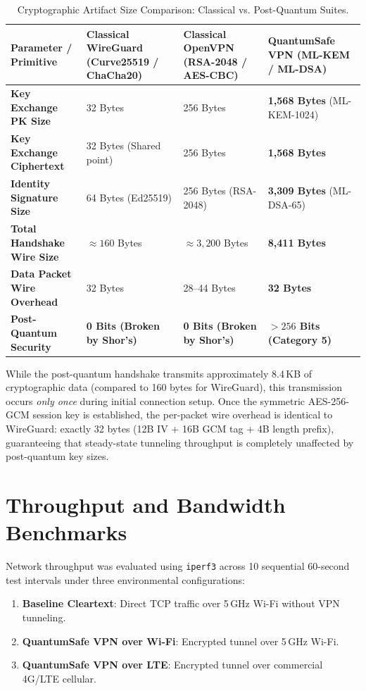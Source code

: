 \begin{table}[htbp]
  \centering
  \small
  \caption{Cryptographic Artifact Size Comparison: Classical vs. Post-Quantum Suites.}
  \label{tab:crypto_size_comparison}
  \begin{tabular}{@{}P{3.6cm}P{3.4cm}P{3.4cm}P{3.6cm}@{}}
    \toprule
    \textbf{Parameter / Primitive} & \textbf{Classical WireGuard (Curve25519 / ChaCha20)} & \textbf{Classical OpenVPN (RSA-2048 / AES-CBC)} & \textbf{QuantumSafe VPN (ML-KEM / ML-DSA)} \\
    \midrule
    \textbf{Key Exchange PK Size} & 32 Bytes & 256 Bytes & \textbf{1,568 Bytes} (ML-KEM-1024) \\
    \textbf{Key Exchange Ciphertext} & 32 Bytes (Shared point) & 256 Bytes & \textbf{1,568 Bytes} \\
    \textbf{Identity Signature Size} & 64 Bytes (Ed25519) & 256 Bytes (RSA-2048) & \textbf{3,309 Bytes} (ML-DSA-65) \\
    \textbf{Total Handshake Wire Size} & $\approx 160$ Bytes & $\approx 3,200$ Bytes & \textbf{8,411 Bytes} \\
    \textbf{Data Packet Wire Overhead} & 32 Bytes & 28--44 Bytes & \textbf{32 Bytes} \\
    \textbf{Post-Quantum Security} & \textbf{0 Bits (Broken by Shor's)} & \textbf{0 Bits (Broken by Shor's)} & \textbf{$> 256$ Bits (Category 5)} \\
    \bottomrule
  \end{tabular}
\end{table}

While the post-quantum handshake transmits approximately 8.4\,KB of cryptographic data (compared to 160 bytes for WireGuard), this transmission occurs \textit{only once} during initial connection setup. Once the symmetric AES-256-GCM session key is established, the per-packet wire overhead is identical to WireGuard: exactly 32 bytes (12B IV + 16B GCM tag + 4B length prefix), guaranteeing that steady-state tunneling throughput is completely unaffected by post-quantum key sizes.

\section{Throughput and Bandwidth Benchmarks}
\label{sec:throughput_benchmarks}

Network throughput was evaluated using \texttt{iperf3} across 10 sequential 60-second test intervals under three environmental configurations:
\begin{enumerate}
    \item \textbf{Baseline Cleartext}: Direct TCP traffic over 5\,GHz Wi-Fi without VPN tunneling.
    \item \textbf{QuantumSafe VPN over Wi-Fi}: Encrypted tunnel over 5\,GHz Wi-Fi.
    \item \textbf{QuantumSafe VPN over LTE}: Encrypted tunnel over commercial 4G/LTE cellular.
\end{enumerate}

